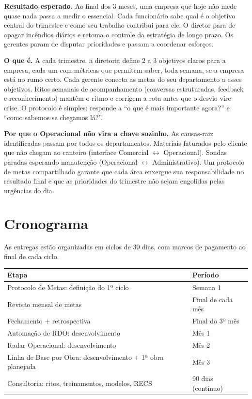 \documentclass[12pt,a4paper]{scrartcl}
\begin{document}
\textbf{Resultado esperado.} Ao final dos 3 meses, uma empresa que hoje não mede quase nada passa a medir o essencial. Cada funcionário sabe qual é o objetivo central do trimestre e como seu trabalho contribui para ele. O diretor para de apagar incêndios diários e retoma o controle da estratégia de longo prazo. Os gerentes param de disputar prioridades e passam a coordenar esforços.

\textbf{O que é.} A cada trimestre, a diretoria define 2 a 3 objetivos claros para a empresa, cada um com métricas que permitem saber, toda semana, se a empresa está no rumo certo. Cada gerente conecta as metas do seu departamento a esses objetivos. Ritos semanais de acompanhamento (conversas estruturadas, feedback e reconhecimento) mantêm o ritmo e corrigem a rota antes que o desvio vire crise. O protocolo é simples: responde a ``o que é mais importante agora?'' e ``como sabemos se chegamos lá?''.

\textbf{Por que o Operacional não vira a chave sozinho.} As causas-raiz identificadas passam por todos os departamentos. Materiais faturados pelo cliente que não chegam ao canteiro (interface Comercial $\leftrightarrow$ Operacional). Sondas paradas esperando manutenção (Operacional $\leftrightarrow$ Administrativo). Um protocolo de metas compartilhado garante que cada área enxergue sua responsabilidade no resultado final e que as prioridades do trimestre não sejam engolidas pelas urgências do dia.

\section{Cronograma}

As entregas estão organizadas em ciclos de 30 dias, com marcos de pagamento ao final de cada ciclo.

\vspace{0.3cm}
\begin{tabular}{p{6cm} p{9cm}}
\textbf{Etapa} & \textbf{Período} \\
\hline
Protocolo de Metas: definição do 1º ciclo & Semana 1 \\
Revisão mensal de metas & Final de cada mês \\
Fechamento + retrospectiva & Final do 3º mês \\
\hline
Automação de RDO: desenvolvimento & Mês 1 \\
\hline
Radar Operacional: desenvolvimento & Mês 2 \\
\hline
Linha de Base por Obra: desenvolvimento + 1ª obra planejada & Mês 3 \\
\hline
Consultoria: ritos, treinamentos, modelos, RECS & 90 dias (contínuo) \\
\end{tabular}
\vspace{0.3cm}
\end{document}
